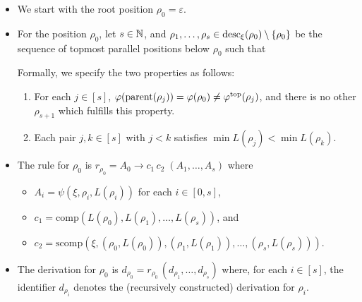 \documentclass[../../document.tex]{subfiles}
\begin{document}
    \begin{itemize}
        \item We start with the root position \(\rho_0 = \varepsilon\).
        \item
            For the position \(\rho_0\), let \(s\in \mathbb{N}\), and \(\rho_1, \ldots, \rho_s \in \operatorname{desc}_\xi(\rho_0) \setminus \{\rho_0\}\) be the sequence of topmost parallel positions below \(\rho_0\) such that
            Formally, we specify the two properties as follows:
            \begin{enumerate}
                \item For each \(j \in [s]\), \(\varphi(\operatorname{parent}(\rho_j)) = \varphi(\rho_0) \neq \varphi^{\text{top}}(\rho_j)\), and there is no other \(\rho_{s+1}\) which fulfills this property.
                \item Each pair \(j,k \in [s]\) with \(j<k\) satisfies \(\min L(\rho_j) < \min L(\rho_k)\).
            \end{enumerate}
        \item The rule for \(\rho_0\) is \(r_{\rho_0} = A_0 \to c_1 \, c_2\; (A_1, \ldots, A_s)\) where
        \begin{itemize}
            \item \(A_i = \psi(\xi, \rho_i, L(\rho_i))\) for each \(i \in [0,s]\),
            \item \(c_1 = \mathrm{comp}(L(\rho_0), L(\rho_1), \ldots, L(\rho_s))\), and
            \item \(c_2 = \mathrm{scomp}(\xi, (\rho_0, L(\rho_0)), (\rho_1, L(\rho_1)), \ldots, (\rho_s, L(\rho_s)))\).
        \end{itemize}
        \item The derivation for \(\rho_0\) is \(d_{\rho_0} = r_{\rho_0}\,(d_{\rho_1}, \ldots, d_{\rho_s})\) where, for each \(i\in[s]\), the identifier \(d_{\rho_i}\) denotes the (recursively constructed) derivation for \(\rho_i\).
    \end{itemize}
\end{document}
